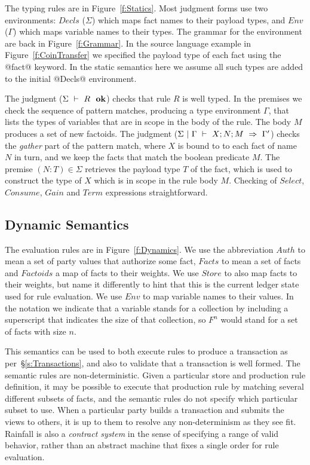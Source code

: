 The typing rules are in Figure~\ref{f:Statics}. Most judgment forms use two environments: $Decls$ ($\Sigma$) which maps fact names to their payload types, and $Env$ ($\Gamma$) which maps variable names to their types. The grammar for the environment are back in Figure~\ref{f:Grammar}. In the source language example in Figure~\ref{f:CoinTransfer} we specified the payload type of each fact using the @fact@ keyword. In the static semantics here we assume all such types are added to the initial @Decls@ environment.

The judgment ($\Sigma ~\vdash~ R~~ \textbf{ok}$) checks that rule $R$ is well typed. In the premises we check the sequence of pattern matches, producing a type environment $\Gamma$, that lists the types of variables that are in scope in the body of the rule. The body $M$ produces a set of new factoids. The judgment ($\Sigma~|~\Gamma~\vdash~X ; N ; M~\Rightarrow~\Gamma'$) checks the \emph{gather} part of the pattern match, where $X$ is bound to to each fact of name $N$ in turn, and we keep the facts that match the boolean predicate $M$. The premise $(N:T) \in \Sigma$ retrieves the payload type $T$ of the fact, which is used to construct the type of $X$ which is in scope in the rule body $M$. Checking of $Select$, $Consume$, $Gain$ and $Term$ expressions straightforward.





\subsection{Dynamic Semantics}
The evaluation rules are in Figure~\ref{f:Dynamics}. We use the abbreviation $Auth$ to mean a set of party values that authorize some fact, $Facts$ to mean a set of facts and $Factoids$ a map of facts to their weights. We use $Store$ to also map facts to their weights, but name it differently to hint that this is the current ledger state used for rule evaluation. We use $Env$ to map variable names to their values. In the notation we indicate that a variable stands for a collection by including a superscript that indicates the size of that collection, so $F^n$ would stand for a set of facts with size $n$.

This semantics can be used to both execute rules to produce a transaction as per~\S\ref{s:Transactions}, and also to validate that a transaction is well formed. The semantic rules are non-deterministic. Given a particular store and production rule definition, it may be possible to execute that production rule by matching several different subsets of facts, and the semantic rules do not specify which particular subset to use. When a particular party builds a transaction and submits the views to others, it is up to them to resolve any  non-determinism as they see fit. Rainfall is also a \emph{contract system} in the sense of specifying a range of valid behavior, rather than an abstract machine that fixes a single order for rule evaluation.

